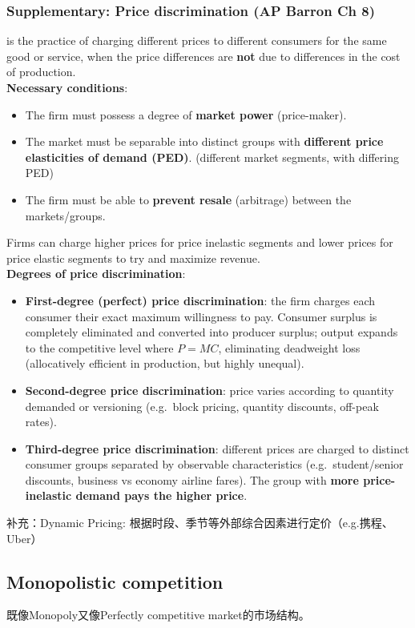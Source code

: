 \subsubsection*{Supplementary: Price discrimination (AP Barron Ch 8)}
 is the practice of charging different prices to different consumers for the same good or service, when the price differences are \textbf{not} due to differences in the cost of production.
\\\textbf{Necessary conditions}:
\begin{itemize}
  \item The firm must possess a degree of \textbf{market power} (price-maker).
  \item The market must be separable into distinct groups with \textbf{different price elasticities of demand (PED)}. (different market segments, with differing PED)
  \item The firm must be able to \textbf{prevent resale} (arbitrage) between the markets/groups.
\end{itemize}
Firms can charge higher prices for price inelastic segments and lower prices for price elastic segments to try and maximize revenue.\\
\textbf{Degrees of price discrimination}:
\begin{itemize}
  \item \textbf{First-degree (perfect) price discrimination}: the firm charges each consumer their exact maximum willingness to pay. Consumer surplus is completely eliminated and converted into producer surplus; output expands to the competitive level where $P = MC$, eliminating deadweight loss (allocatively efficient in production, but highly unequal).
  \item \textbf{Second-degree price discrimination}: price varies according to quantity demanded or versioning (e.g.\ block pricing, quantity discounts, off-peak rates).
  \item \textbf{Third-degree price discrimination}: different prices are charged to distinct consumer groups separated by observable characteristics (e.g.\ student/senior discounts, business vs economy airline fares). The group with \textbf{more price-inelastic demand pays the higher price}.
\end{itemize}
补充：Dynamic Pricing: 根据时段、季节等外部综合因素进行定价（e.g.携程、Uber）
\subsection{Monopolistic competition}
既像Monopoly又像Perfectly competitive market的市场结构。
